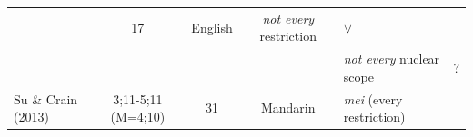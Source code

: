 \documentclass[oneside]{report}
\theoremstyle{definition}
\theoremstyle{definition}
\theoremstyle{definition}
\theoremstyle{remark}
\begin{document}
\begin{longtable}[]{@{}lccclc@{}}
\begin{minipage}[t]{0.07\columnwidth}
\end{minipage} & \begin{minipage}[t]{0.05\columnwidth}\centering\strut
17\strut
\end{minipage} & \begin{minipage}[t]{0.10\columnwidth}\centering\strut
English\strut
\end{minipage} & \begin{minipage}[t]{0.25\columnwidth}\raggedright\strut
\emph{not every} restriction\strut
\end{minipage} & \begin{minipage}[t]{0.13\columnwidth}\centering\strut
\(\lor\)\strut
\end{minipage}\tabularnewline
\begin{minipage}[t]{0.23\columnwidth}\raggedright\strut
\strut
\end{minipage} & \begin{minipage}[t]{0.07\columnwidth}\centering\strut
\strut
\end{minipage} & \begin{minipage}[t]{0.05\columnwidth}\centering\strut
\strut
\end{minipage} & \begin{minipage}[t]{0.10\columnwidth}\centering\strut
\strut
\end{minipage} & \begin{minipage}[t]{0.25\columnwidth}\raggedright\strut
\emph{not every} nuclear scope\strut
\end{minipage} & \begin{minipage}[t]{0.13\columnwidth}\centering\strut
?\strut
\end{minipage}\tabularnewline
\begin{minipage}[t]{0.23\columnwidth}\raggedright\strut
Su \& Crain (2013)\strut
\end{minipage} & \begin{minipage}[t]{0.07\columnwidth}\centering\strut
3;11-5;11 (M=4;10)\strut
\end{minipage} & \begin{minipage}[t]{0.05\columnwidth}\centering\strut
31\strut
\end{minipage} & \begin{minipage}[t]{0.10\columnwidth}\centering\strut
Mandarin\strut
\end{minipage} & \begin{minipage}[t]{0.25\columnwidth}\raggedright\strut
\emph{mei} (every restriction)\strut
\end{minipage} & \begin{minipage}[t]{0.13\columnwidth}\centering\strut

\end{minipage}
\end{longtable}
\end{document}
